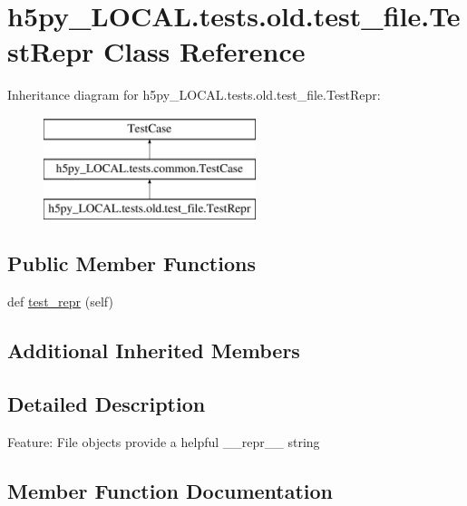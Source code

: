 \hypertarget{classh5py__LOCAL_1_1tests_1_1old_1_1test__file_1_1TestRepr}{}\section{h5py\+\_\+\+L\+O\+C\+A\+L.\+tests.\+old.\+test\+\_\+file.\+Test\+Repr Class Reference}
\label{classh5py__LOCAL_1_1tests_1_1old_1_1test__file_1_1TestRepr}
Inheritance diagram for h5py\+\_\+\+L\+O\+C\+A\+L.\+tests.\+old.\+test\+\_\+file.\+Test\+Repr\+:\begin{figure}[H]
\begin{center}
\leavevmode
\includegraphics[height=3.000000cm]{classh5py__LOCAL_1_1tests_1_1old_1_1test__file_1_1TestRepr}
\end{center}
\end{figure}
\subsection*{Public Member Functions}
\begin{DoxyCompactItemize}
\item 
def \hyperlink{classh5py__LOCAL_1_1tests_1_1old_1_1test__file_1_1TestRepr_a5a914a2ff3fb6f318c9a80eb0104c233}{test\+\_\+repr} (self)
\end{DoxyCompactItemize}
\subsection*{Additional Inherited Members}


\subsection{Detailed Description}
\begin{DoxyVerb}    Feature: File objects provide a helpful __repr__ string
\end{DoxyVerb}
 

\subsection{Member Function Documentation}
\mbox{\label{classh5py__LOCAL_1_1tests_1_1old_1_1test__file_1_1TestRepr_a5a914a2ff3fb6f318c9a80eb0104c233}} 
